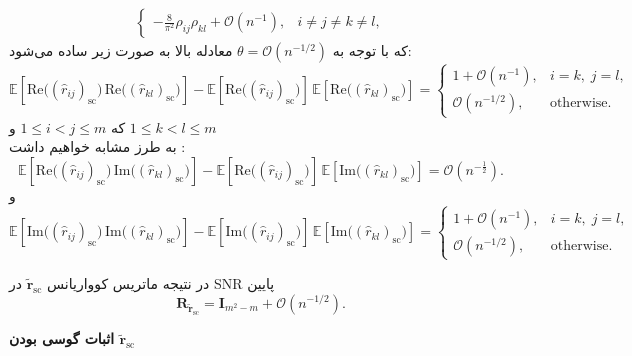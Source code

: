 \begin{اثبات}
\begin{align}
\begin{cases}
			-\tfrac{8}{\pi^{2}}\rho_{ij}\rho_{kl}+\mathcal{O}(n^{-1}), & i\neq j\neq k\neq l,
		\end{cases}
	\end{align}
	که با توجه به \(\theta=\mathcal{O}(n^{-1/2})\) معادله بالا به صورت زیر ساده می‌شود:
	\begin{equation}
		\mathbb{E}\!\left[\mathrm{Re}\big((\hat r_{ij})_{\mathrm{sc}}\big)\,
		\mathrm{Re}\big((\hat r_{kl})_{\mathrm{sc}}\big)\right]
		- \mathbb{E}\!\left[\mathrm{Re}\big((\hat r_{ij})_{\mathrm{sc}}\big)\right]\,
		\mathbb{E}\!\left[\mathrm{Re}\big((\hat r_{kl})_{\mathrm{sc}}\big)\right]
		=
		\begin{cases}
			1+\mathcal{O}(n^{-1}), & i=k,\; j=l, \\[6pt]
			\mathcal{O}(n^{-1/2}), & \text{otherwise}.
		\end{cases}
	\end{equation}
	که 
	$1 \leq i < j \leq m$ 
	و
	$1 \leq k < l \leq m$ \\
	به طرز مشابه خواهیم داشت :
	\begin{equation}
		\mathbb{E}\!\left[\mathrm{Re}\big((\hat r_{ij})_{\mathrm{sc}}\big)\,
		\mathrm{Im}\big((\hat r_{kl})_{\mathrm{sc}}\big)\right]
		- \mathbb{E}\!\left[\mathrm{Re}\big((\hat r_{ij})_{\mathrm{sc}}\big)\right]\,
		\mathbb{E}\!\left[\mathrm{Im}\big((\hat r_{kl})_{\mathrm{sc}}\big)\right]
		= \mathcal{O}(n^{-\tfrac{1}{2}}).
	\end{equation}
	و
	\begin{equation}
		\mathbb{E}\!\left[\mathrm{Im}\big((\hat r_{ij})_{\mathrm{sc}}\big)\,
		\mathrm{Im}\big((\hat r_{kl})_{\mathrm{sc}}\big)\right]
		- \mathbb{E}\!\left[\mathrm{Im}\big((\hat r_{ij})_{\mathrm{sc}}\big)\right]\,
		\mathbb{E}\!\left[\mathrm{Im}\big((\hat r_{kl})_{\mathrm{sc}}\big)\right]
		=
		\begin{cases}
			1+\mathcal{O}(n^{-1}), & i=k,\; j=l, \\[6pt]
			\mathcal{O}(n^{-1/2}), & \text{otherwise}.
		\end{cases}
	\end{equation}
	
	
	
	
	در نتیجه ماتریس کوواریانس \(\tilde{\mathbf{r}}_{\mathrm{sc}}\) در SNR پایین
	\begin{equation}
		\mathbf{R}_{\tilde{\mathbf{r}}_{\mathrm{sc}}}=\mathbf{I}_{m^{2}-m}+\mathcal{O}(n^{-1/2}). 
	\end{equation}
	
	\textbf{اثبات گوسی بودن $\tilde{\mathbf{r}}_{\mathrm{sc}}$}
	

\end{اثبات}
